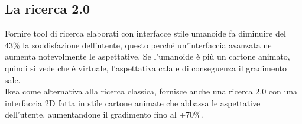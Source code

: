 \subsection{La ricerca 2.0}
Fornire tool di ricerca elaborati con interfacce stile umanoide fa diminuire del 43\% la soddisfazione dell'utente, questo perché un'interfaccia avanzata ne aumenta notevolmente le aspettative.
Se l'umanoide è più un cartone animato, quindi si vede che è virtuale, l'aspettativa cala e di conseguenza il gradimento sale.\\
Ikea come alternativa alla ricerca classica, fornisce anche una ricerca 2.0 con una interfaccia 2D  fatta in stile cartone animate che abbassa le aspettative dell'utente, aumentandone il gradimento fino al +70\%.



